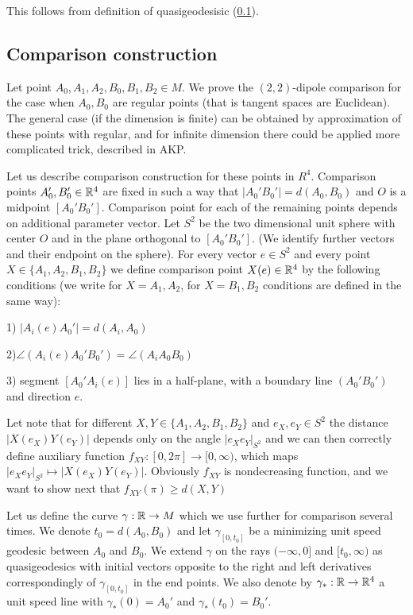 \documentclass[a4paper,12pt]{article}
\theoremstyle{definition}
\theoremstyle{definition}
\theoremstyle{definition}
\begin{document}
This follows from definition of quasigeodesisic (\ref{}).

\subsection{Comparison construction}
 Let point $A_0, A_1, A_2, B_0, B_1, B_2\in M$.
 We prove the $(2,2)$-dipole comparison for the case when
  $A_0, B_0$ are regular points (that is tangent spaces are Euclidean). 
 The general case (if the dimension is finite)  can be obtained by approximation of these points
with regular, and for infinite dimension there could be applied more complicated trick,
described in AKP.  
 
 Let us describe comparison construction for these points in
    $R^4$.
    Comparison points $A_0', B_0'\in{\mathbb R}^4 $ are fixed in such a way that
    $|A_0'B_0'|=d(A_0, B_0)$
and    $O$ is a midpoint $[A_0'B_0']$. 
Comparison point for each of the remaining points 
depends on additional parameter vector. 
Let $S^2$ be the
    two dimensional unit sphere with center $O$ and 
    in the plane orthogonal to $[A_0'B_0']$. (We identify further vectors
    and their endpoint on the sphere).
 For every  vector $e\in S^2$ and every point $X\in\{A_1, A_2, B_1, B_2\}$
  we  define  
   comparison point $X(e)\in{\mathbb R}^4$
 by the following conditions (we write for $X=A_1, A_2$, for $X=B_1,B_2$ conditions are
 defined in the same way):
   
    1) $|A_i(e)A_0'|=d(A_i, A_0)$
    
    2)$\angle (A_i(e)A_0'B_0')=\angle(A_i A_0 B_0)$
    
    3) segment $[A_0'A_i(e)]$ lies in a half-plane,    with a boundary line $(A_0'B_0')$
    and direction $e$.
    
Let note that for different
$X, Y \in\{A_1, A_2, B_1, B_2\}$ and $e_X, e_Y\in S^2$
the distance 
$|X(e_X) Y(e_Y)|$ depends only on the angle $|e_Xe_Y|_{S^2}$
and we can then correctly define auxiliary  function
$f_{XY}:[0,2\pi]\to[0,\infty)$, which maps
$|e_Xe_Y|_{S^2}\mapsto |X(e_X) Y(e_Y)|$.
Obviously $f_{XY}$ is nondecreasing function,
and we want to show next that 
$f_{XY}(\pi)\ge d(X,Y)$

Let us define the curve $\gamma:{\mathbb R}\to M$ which we use
further for comparison several times.
We denote $t_0=d(A_0,B_0)$ and let
$\gamma_{[0, t_0]}$ be a minimizing unit speed geodesic
 between $A_0$ and $B_0$.
 We extend $\gamma$ on the rays
 $(-\infty, 0]$ and $[t_0,\infty)$ as quasigeodesics
 with initial vectors
 opposite to the right and left derivatives correspondingly of $\gamma_{[0, t_0]}$ in the end points.
  We also denote by 
 $\gamma_*:{\mathbb R}\to {\mathbb R}^4$ a unit speed line with
  $\gamma_*(0)=A_0'$ and $\gamma_*(t_0)=B_0'$. 
\end{document}
